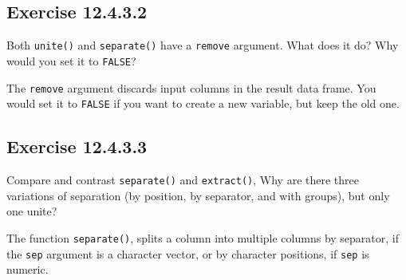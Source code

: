 \documentclass[]{book}
\newenvironment{Shaded}{\begin{snugshade}}{\end{snugshade}}
\newcommand{\CommentTok}[1]{\textcolor[rgb]{0.56,0.35,0.01}{\textit{#1}}}
\newcommand{\DataTypeTok}[1]{\textcolor[rgb]{0.13,0.29,0.53}{#1}}
\newcommand{\KeywordTok}[1]{\textcolor[rgb]{0.13,0.29,0.53}{\textbf{#1}}}
\newcommand{\NormalTok}[1]{#1}
\newcommand{\OperatorTok}[1]{\textcolor[rgb]{0.81,0.36,0.00}{\textbf{#1}}}
\newcommand{\StringTok}[1]{\textcolor[rgb]{0.31,0.60,0.02}{#1}}
\theoremstyle{plain}
\theoremstyle{remark}
\begin{document}
\begin{Shaded}
\end{Shaded}

\hypertarget{exercise-12.4.3.2}{%
\subsection*{\texorpdfstring{Exercise
{12.4.3.2}}{Exercise 12.4.3.2}}\label{exercise-12.4.3.2}}

Both \texttt{unite()} and \texttt{separate()} have a \texttt{remove}
argument. What does it do? Why would you set it to \texttt{FALSE}?

The \texttt{remove} argument discards input columns in the result data
frame. You would set it to \texttt{FALSE} if you want to create a new
variable, but keep the old one.

\hypertarget{exercise-12.4.3.3}{%
\subsection*{\texorpdfstring{Exercise
{12.4.3.3}}{Exercise 12.4.3.3}}\label{exercise-12.4.3.3}}

Compare and contrast \texttt{separate()} and \texttt{extract()}, Why are
there three variations of separation (by position, by separator, and
with groups), but only one unite?

The function \texttt{separate()}, splits a column into multiple columns
by separator, if the \texttt{sep} argument is a character vector, or by
character positions, if \texttt{sep} is numeric.
\end{document}
